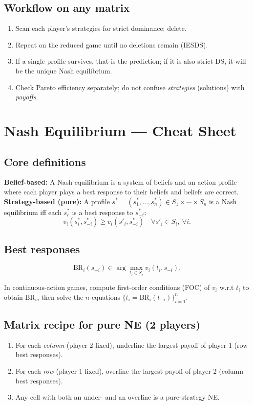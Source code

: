\documentclass[11pt]{article}
\newcommand{\br}{\mathrm{BR}}
\begin{document}
\begin{multicols}{2}
\subsection*{Workflow on any matrix}
\begin{enumerate}[label=\arabic*)]
\item Scan each player’s strategies for strict dominance; delete.
\item Repeat on the reduced game until no deletions remain (IESDS).
\item If a single profile survives, that is the prediction; if it is also strict DS, it will be the unique Nash equilibrium.
\item Check Pareto efficiency separately; do not confuse \emph{strategies} (solutions) with \emph{payoffs}.
\end{enumerate}


\newpage
\section*{Nash Equilibrium — Cheat Sheet}

\subsection*{Core definitions}
\textbf{Belief-based:} A Nash equilibrium is a system of beliefs and an action profile where each player plays a best response to their beliefs and beliefs are correct. \\
\textbf{Strategy-based (pure):} A profile $s^*=(s_1^*,\dots,s_n^*)\in S_1\times\cdots\times S_n$ is a Nash equilibrium iff each $s_i^*$ is a best response to $s_{-i}^*$:
\[
v_i(s_i^*,s_{-i}^*) \ge v_i(s'_i,s_{-i}^*) \quad \forall s'_i\in S_i,\ \forall i.
\]

\subsection*{Best responses}
\[
\br_i(s_{-i}) \in \arg\max_{t_i\in S_i} v_i(t_i,s_{-i}).
\]

In continuous-action games, compute first-order conditions (FOC) of $v_i$ w.r.t $t_i$ to obtain $\br_i$, then solve the $n$ equations $\{t_i=\br_i(t_{-i})\}_{i=1}^n$.

\subsection*{Matrix recipe for pure NE (2 players)}
\begin{enumerate}[label=\arabic*)]
\item For each \emph{column} (player 2 fixed), underline the largest payoff of player 1 (row best responses).
\item For each \emph{row} (player 1 fixed), overline the largest payoff of player 2 (column best responses).
\item Any cell with both an under- and an overline is a pure-strategy NE.
\end{enumerate}


\end{multicols}
\end{document}
